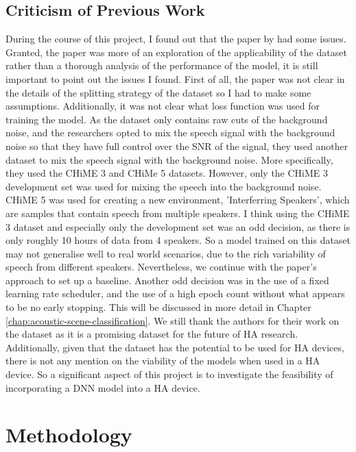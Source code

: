 \documentclass[logo,bsc,singlespacing,parskip,online]{infthesis}
\begin{document}
\section{Criticism of Previous Work}
During the course of this project, I found out that the paper by \citet{Huwel2020HearDS} had some issues.
Granted, the paper was more of an exploration of the applicability of the dataset rather than a thorough analysis of the 
performance of the model, it is still important to point out the issues I found. First of all, the paper was not clear 
in the details of the splitting strategy of the dataset so I had to make some assumptions. Additionally, it was not clear 
what loss function was used for training the model. As the dataset only contains raw cuts of the background noise, and 
the researchers opted to mix the speech signal with the background noise so that they have full control over the SNR of the signal,
they used another dataset to mix the speech signal with the background noise. More specifically, they used the CHiME 3 \cite{barker_third_2015} 
and CHiMe 5 \cite{barker18_fifth_2018} datasets. However, only the CHiME 3 development set was used for mixing the speech into the background noise.
CHiME 5 was used for creating a new environment, 'Interferring Speakers', which are samples that contain speech from multiple speakers.
I think using the CHiME 3 dataset and especially only the development set was an odd decision, as there is only roughly 10 hours of data 
from 4 speakers. So a model trained on this dataset may not generalise well to real world scenarios, due to the rich variability of 
speech from different speakers. Nevertheless, we continue with the paper's approach to set up a baseline. Another odd decision was 
in the use of a fixed learning rate scheduler, and the use of a high epoch count without what appears to be no early stopping. This 
will be discussed in more detail in Chapter \ref{chap:acoustic-scene-classification}. We still thank the authors for their work on the dataset 
as it is a promising dataset for the future of HA research. Additionally, given that the dataset 
has the potential to be used for HA devices, there is not any mention on the viability of the models 
when used in a HA device. So a significant aspect of this project is to investigate the feasibility of 
incorporating a DNN model into a HA device. 


\chapter{Methodology}
\end{document}
